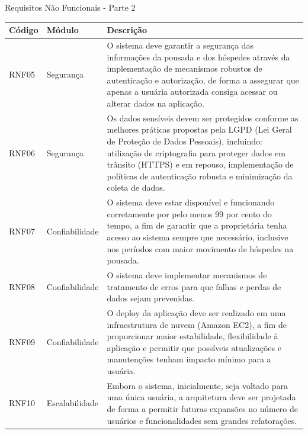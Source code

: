 \documentclass[
	12pt,				%
	openany,			%
	oneside,			%
	a4paper,			%
	english,			%
	french,				%
	spanish,			%
	brazil				%
	]{abntex2}
\begin{document}
\begin{quadro}[H]
	\caption{\label{quadro_rnf2}Requisitos Não Funcionais - Parte 2}
	\begin{tabular}{|>{\centering\arraybackslash}m{2cm}|>{\centering\arraybackslash}m{4cm}|>{\raggedright\arraybackslash}m{8cm}|}
		\hline
		\textbf{Código} & \textbf{Módulo} & \textbf{Descrição} \\ \hline
		RNF05 & Segurança & O sistema deve garantir a segurança das informações da pousada e dos hóspedes através da implementação de mecanismos robustos de autenticação e autorização, de forma a assegurar que apenas a usuária autorizada consiga acessar ou alterar dados na aplicação. \\ \hline
		RNF06 & Segurança & Os dados sensíveis devem ser protegidos conforme as melhores práticas propostas pela LGPD (Lei Geral de Proteção de Dados Pessoais), incluindo: utilização de criptografia para proteger dados em trânsito (HTTPS) e em repouso, implementação de políticas de autenticação robusta e minimização da coleta de dados. \\ \hline
		RNF07 & Confiabilidade & O sistema deve estar disponível e funcionando corretamente por pelo menos 99 por cento do tempo, a fim de garantir que a proprietária tenha acesso ao sistema sempre que necessário, inclusive nos períodos com maior movimento de hóspedes na pousada. \\ \hline
		RNF08 & Confiabilidade & O sistema deve implementar mecanismos de tratamento de erros para que falhas e perdas de dados sejam prevenidas. \\ \hline
		RNF09 & Confiabilidade & O deploy da aplicação deve ser realizado em uma infraestrutura de nuvem (Amazon EC2), a fim de proporcionar maior estabilidade, flexibilidade à aplicação e permitir que possíveis atualizações e manutenções tenham impacto mínimo para a usuária. \\ \hline
		RNF10 & Escalabilidade & Embora o sistema, inicialmente, seja voltado para uma única usuária, a arquitetura deve ser projetada de forma a permitir futuras expansões no número de usuários e funcionalidades sem grandes refatorações. \\ \hline
	\end{tabular}
\end{quadro}
%
\end{document}
